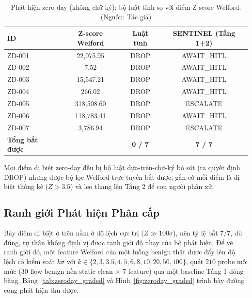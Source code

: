 \begin{table}[!htbp]
    \centering
    \caption{Phát hiện zero-day (không-chữ-ký): bộ luật tĩnh so với điểm Z-score Welford. (Nguồn: Tác giả)}
    \label{tab:zeroday}
    \begin{tabular}{|l|c|c|c|}
        \hline
        \textbf{ID} & \textbf{Z-score Welford} & \textbf{Luật tĩnh} & \textbf{SENTINEL (Tầng 1+2)} \\
        \hline
        ZD-001 & 22{,}075.95 & DROP & AWAIT\_HITL \\
        \hline
        ZD-002 & 7.52 & DROP & AWAIT\_HITL \\
        \hline
        ZD-003 & 15{,}547.21 & DROP & AWAIT\_HITL \\
        \hline
        ZD-004 & 266.02 & DROP & AWAIT\_HITL \\
        \hline
        ZD-005 & 318{,}508.60 & DROP & ESCALATE \\
        \hline
        ZD-006 & 118{,}783.41 & DROP & AWAIT\_HITL \\
        \hline
        ZD-007 & 3{,}786.94 & DROP & ESCALATE \\
        \hline
        \textbf{Tổng bắt được} & & \textbf{0 / 7} & \textbf{7 / 7} \\
        \hline
    \end{tabular}
\end{table}

Mọi điểm dị biệt zero-day đều bị bộ luật dựa-trên-chữ-ký bỏ sót (ra quyết định DROP) nhưng được bộ lọc Welford trực tuyến bắt được, gắn cờ mỗi điểm là dị biệt thống kê ($Z > 3.5$) và leo thang lên Tầng 2 để con người phân xử.

\subsection{Ranh giới Phát hiện Phân cấp}
Bảy điểm dị biệt ở trên nằm ở độ lệch cực trị ($Z \gg 100\sigma$), nên tỷ lệ bắt $7/7$, dù đúng, tự thân không định vị được ranh giới độ nhạy của bộ phát hiện. Để vẽ ranh giới đó, một feature Welford của một luồng benign thật được đẩy lên độ lệch có kiểm soát $k\sigma$ với $k \in \{2, 3, 3.5, 4, 5, 6, 8, 10, 20, 50, 100\}$, quét $210$ probe mỗi mức ($30$ flow benign nền static-clean $\times$ $7$ feature) qua một baseline Tầng 1 đóng băng. Bảng~\ref{tab:zeroday_graded} và Hình~\ref{fig:zeroday_graded} trình bày đường cong phát hiện thu được.

